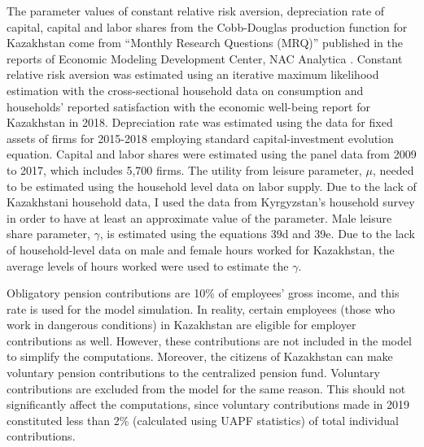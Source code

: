 \documentclass[BufferStockTheory]{subfiles}
\begin{document}
The parameter values of constant relative risk aversion, depreciation rate of capital, capital and labor shares from the Cobb-Douglas production function for Kazakhstan come from “Monthly Research Questions (MRQ)” published in the reports of Economic Modeling Development Center, NAC Analytica \cite{adilkhanova}. Constant relative risk aversion was estimated using an iterative maximum likelihood estimation with the cross-sectional household data on consumption and households’ reported satisfaction with the economic well-being report for Kazakhstan in 2018. Depreciation rate was estimated using the data for fixed assets of firms for 2015-2018 employing standard capital-investment evolution equation. Capital and labor shares were estimated using the panel data from 2009 to 2017, which includes 5,700 firms. The utility from leisure parameter, $\mu$, needed to be estimated using the household level data on labor supply.
Due to the lack of Kazakhstani household data, I used the data from Kyrgyzstan's household survey in order to have at least an approximate value of the parameter. Male leisure share parameter, $\gamma$, is estimated using the equations 39d and 39e. Due to the lack of household-level data on male and female hours worked for Kazakhstan, the average levels of hours worked were used to estimate the $\gamma$. 

Obligatory pension contributions are 10\% of employees’ gross income, and this rate is used for the model simulation. In reality, certain employees (those who work in dangerous conditions) in Kazakhstan are eligible for employer contributions as well. However, these contributions are not included in the model to simplify the computations. Moreover, the citizens of Kazakhstan can make voluntary pension contributions to the centralized pension fund. Voluntary contributions are excluded from the model for the same reason. This should not significantly affect the computations, since voluntary contributions made in 2019 constituted less than 2\% (calculated using UAPF statistics) of total individual contributions.



\onlyinsubfile{}
\end{document}
